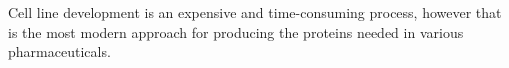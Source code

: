 \section*{}
Cell line development is an expensive and time-consuming process, however that is the most modern approach for producing the proteins needed in various pharmaceuticals.